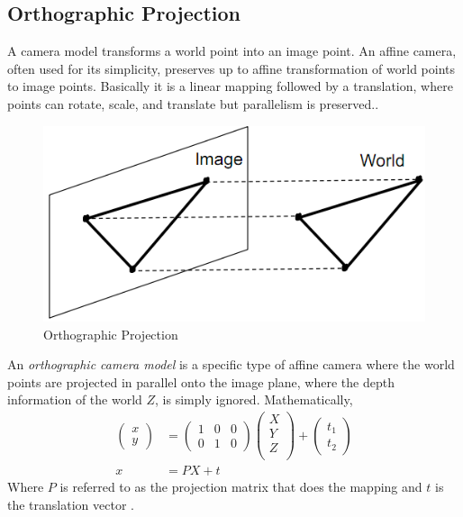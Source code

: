 \subsection{Orthographic Projection}
\label{sec:ortho}
A camera model transforms a world point into an
image point. An affine camera, often used for
its simplicity, preserves up to affine transformation of world points
to image points. Basically it is a linear mapping followed by a translation, where
points can rotate, scale, and translate but parallelism is
preserved.\cite[p.38]{Szelski}. 
\begin{figure}[!ht]
  \begin{center}
  \includegraphics[scale=0.8]{ortho.png}
  \caption{Orthographic Projection} 
  \label{figures:ortho}
  \end{center}
\end{figure}
An \emph{orthographic
camera model} is a specific type of affine camera where the world
points are projected in parallel onto the image plane, where the depth
information of the world $Z$, is simply ignored. Mathematically, 
\begin{align*}
\begin{pmatrix}
  x\\y
\end{pmatrix} &= \begin{pmatrix}
  1& 0&0 \\0 & 1 & 0
\end{pmatrix}
\begin{pmatrix}
  X\\Y\\Z\\
\end{pmatrix}  +
\begin{pmatrix}
  t_1\\t_2
\end{pmatrix}
\\
x &= PX + t
\end{align*}
Where $P$ is referred to as the projection matrix that does the
mapping and $t$ is the translation
vector \cite[p.172]{AZ}. 

